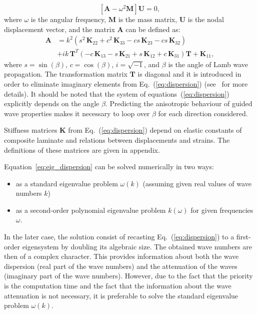 \documentclass[preprint,12pt]{elsarticle}
\newcommand{\matr}[1]{\mathbf{#1}} %
\newcommand{\vect}[1]{\mathbf{#1}} %
\providecommand{\DIFdelbegin}{} %
\begin{document}
	\begin{equation}
	\left[\matr{A} - \omega^2\matr{M} \right] \vect{U} =0,
	\label{eq:eig_dispersion}
	\end{equation}
	where $\omega$ is the angular frequency, $\matr{M}$ is the mass matrix, $\matr{U}$ is the nodal displacement vector, and the matrix $\matr{A}$ can be defined as:
	\begin{equation}
	\begin{aligned}
	\matr{A} & =  k^2\left(s^2 \,\matr{K}_{22} + c^2\, \matr{K}_{33} - c s\, \matr{K}_{23} - c s\, \matr{K}_{32}\right) \\
	& + i k\, \matr{T}^T\left(-c\, \matr{K}_{13} - s\, \matr{K}_{21} + s\, \matr{K}_{12} + c\, \matr{K}_{31}\right) \matr{T} +\matr{K}_{11},
	\end{aligned}
	\label{eq:dispersion}
	\end{equation}
	where  $s = \sin(\beta)$, $c = \cos(\beta)$, $i = \sqrt{-1}$, and $\beta$ is the angle of Lamb wave propagation. The transformation matrix $\matr{T}$ is diagonal and it is introduced in order to eliminate imaginary elements from Eq.~(\ref{eq:dispersion}) (see~\cite{Bartoli2006} for more details). It should be noted that the system of equations~(\ref{eq:dispersion}) explicitly depends on the angle $\beta$. Predicting the anisotropic behaviour of guided wave properties makes it necessary to loop over $\beta$ for each direction considered.

	Stiffness matrices $\matr{K}$ from Eq.~(\ref{eq:dispersion}) depend on elastic constants of composite laminate and relations between displacements and strains. The definitions of these matrices are given in appendix.

	
	Equation~\ref{eq:eig_dispersion} can be solved numerically in two ways:
	\begin{itemize}
		\item as a standard eigenvalue problem $\omega (k)$ (assuming given real values of wave numbers $k$)
		\item as a second-order polynomial eigenvalue problem $k(\omega)$ for given frequencies $\omega$.
	\end{itemize}
In the later case, the solution consist of recasting Eq.~(\ref{eq:dispersion}) to a first-order eigensystem by doubling its algebraic size.  The obtained wave numbers are then of a complex character. This provides information about both the wave dispersion (real part of the wave numbers) and the attenuation of the waves (imaginary part of the wave numbers).  However, due to the fact that the priority is the computation time and the fact that the information about the wave attenuation is not necessary, it is preferable to solve the standard eigenvalue problem $\omega (k)$.
 \DIFdelbegin %
\end{document}
